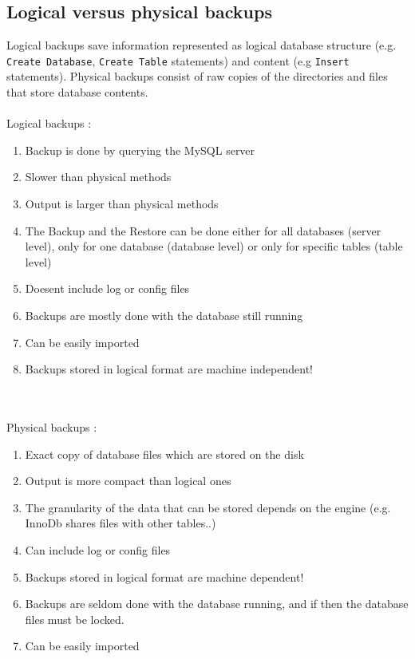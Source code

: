 \documentclass[10pt]{article}
\begin{document}
\subsection{Logical versus physical backups}
Logical backups save information represented as logical database structure (e.g. \texttt{Create Database}, \texttt{Create Table}  statements) and content (e.g \texttt{Insert} statements). Physical backups consist of raw copies of the directories and files that store database contents. \\ \\
Logical backups :
\begin{enumerate}
\item Backup is done by querying the MySQL server
\item Slower than physical methods
\item Output is larger than physical methods
\item The Backup and the Restore can be done either for all databases (server level), only for one database (database level) or only for specific tables (table level)
\item Doesent include log or config files
\item Backups are mostly done with the database still running
\item Can be easily imported
\item Backups stored in logical format are machine independent!
\end{enumerate}\cite{mysqlbackupandrectypesman}
\\ \\Physical backups :
\begin{enumerate}
\item Exact copy of database files which are stored on the disk
\item Output is more compact than logical ones
\item The granularity of the data that can be stored depends on the engine (e.g. InnoDb shares files with other tables..) 
\item Can include log or config files
\item Backups stored in logical format are machine dependent!
\item Backups are seldom done with the database running, and if then the database files must be locked.
\item Can be easily imported
\end{enumerate} \cite{mysqlbackupandrectypesman}
\end{document}
